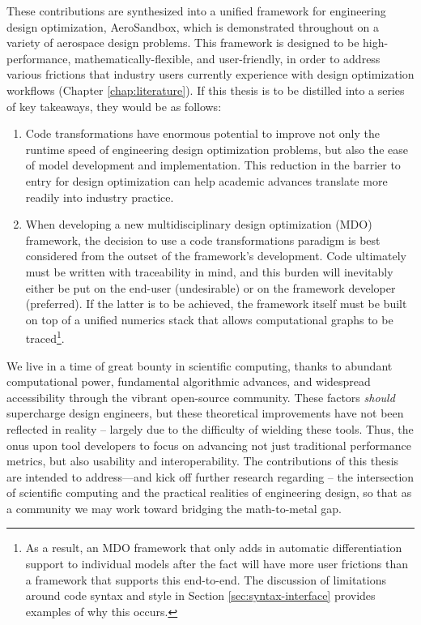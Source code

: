 These contributions are synthesized into a unified framework for engineering design optimization, AeroSandbox, which is demonstrated throughout on a variety of aerospace design problems. This framework is designed to be high-performance, mathematically-flexible, and user-friendly, in order to address various frictions that industry users currently experience with design optimization workflows (Chapter \ref{chap:literature}). If this thesis is to be distilled into a series of key takeaways, they would be as follows:
\begin{enumerate}
    \item Code transformations have enormous potential to improve not only the runtime speed of engineering design optimization problems, but also the ease of model development and implementation. This reduction in the barrier to entry for design optimization can help academic advances translate more readily into industry practice.
    \item When developing a new multidisciplinary design optimization (MDO) framework, the decision to use a code transformations paradigm is best considered from the outset of the framework's development. Code ultimately must be written with traceability in mind, and this burden will inevitably either be put on the end-user (undesirable) or on the framework developer (preferred). If the latter is to be achieved, the framework itself must be built on top of a unified numerics stack that allows computational graphs to be traced\footnote{As a result, an MDO framework that only adds in automatic differentiation support to individual models after the fact will have more user frictions than a framework that supports this end-to-end. The discussion of limitations around code syntax and style in Section \ref{sec:syntax-interface} provides examples of why this occurs.}.
\end{enumerate}

\noindent We live in a time of great bounty in scientific computing, thanks to abundant computational power, fundamental algorithmic advances, and widespread accessibility through the vibrant open-source community. These factors \emph{should} supercharge design engineers, but these theoretical improvements have not been reflected in reality -- largely due to the difficulty of wielding these tools. Thus, the onus upon tool developers to focus on advancing not just traditional performance metrics, but also usability and interoperability. The contributions of this thesis are intended to address—and kick off further research regarding -- the intersection of scientific computing and the practical realities of engineering design, so that as a community we may work toward bridging the math-to-metal gap.